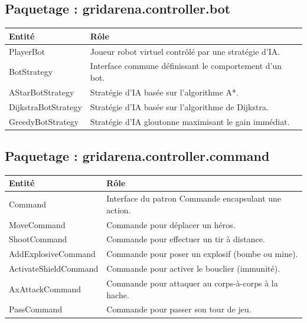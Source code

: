 \documentclass[12pt, a4paper]{article}
\begin{document}
\subsection{Paquetage : gridarena.controller.bot}
\begin{tabular}{|p{7cm}|p{8cm}|}
\hline
\textbf{Entité} & \textbf{Rôle} \\ \hline
PlayerBot & Joueur robot virtuel contrôlé par une stratégie d'IA. \\ \hline
BotStrategy & Interface commune définissant le comportement d'un bot. \\ \hline
AStarBotStrategy & Stratégie d'IA basée sur l'algorithme A*. \\ \hline
DijkstraBotStrategy & Stratégie d'IA basée sur l'algorithme de Dijkstra. \\ \hline
GreedyBotStrategy & Stratégie d'IA gloutonne maximisant le gain immédiat. \\ \hline
\end{tabular}

\subsection{Paquetage : gridarena.controller.command}
\begin{tabular}{|p{7cm}|p{8cm}|}
\hline
\textbf{Entité} & \textbf{Rôle} \\ \hline
Command & Interface du patron Commande encapsulant une action. \\ \hline
MoveCommand & Commande pour déplacer un héros. \\ \hline
ShootCommand & Commande pour effectuer un tir à distance. \\ \hline
AddExplosiveCommand & Commande pour poser un explosif (bombe ou mine). \\ \hline
ActivateShieldCommand & Commande pour activer le bouclier (immunité). \\ \hline
AxAttackCommand & Commande pour attaquer au corps-à-corps à la hache. \\ \hline
PassCommand & Commande pour passer son tour de jeu. \\ \hline
\end{tabular}
\end{document}
